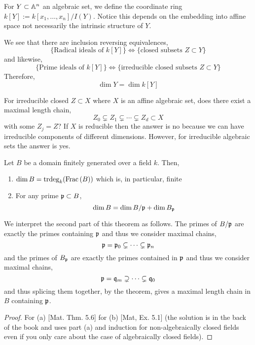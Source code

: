 \documentclass[12pt]{article}
\begin{document}
\begin{defn}
For $Y \subset \mathbb{A}^n$ an algebraic set, we define the coordinate ring $k[Y] := k[x_1, \dots, x_n]/I(Y)$. Notice this depends on the embedding into affine space not necessarily the intrinsic structure of $Y$.
\end{defn}

\begin{rmk}
We see that there are inclusion reversing equivalences,
\[ \{ \text{Radical ideals of } k[Y] \} \iff \{ \text{closed subsets } Z \subset Y \} \]
and likewise,
\[ \{ \text{Prime ideals of } k[Y] \} \iff \{ \text{irreducible closed subsets } Z \subset Y \} \]
Therefore,
\[ \dim{Y} = \dim{k[Y]} \]
\end{rmk}

\begin{rmk}
For irreducible closed $Z \subset X$ where $X$ is an affine algebraic set, does there exist a maximal length chain,
\[ Z_0 \subsetneq Z_1 \subsetneq \cdots \subsetneq Z_d \subset X \]
with some $Z_j = Z$? If $X$ is reducible then the answer is no because we can have irreducible components of different dimensions. However, for irreducible algebraic sets the answer is yes. 
\end{rmk}

\begin{thm}
Let $B$ be a domain finitely generated over a field $k$. Then,
\begin{enumerate}
\item $\dim{B} = \mathrm{trdeg}_{k}(\mathrm{Frac}\left(B\right))$ which is, in particular, finite
\item For any prime $\mathfrak{p} \subset B$,
\[ \dim{B} = \dim{B/\mathfrak{p}} + \dim{B_{\mathfrak{p}}} \]
\end{enumerate}
\end{thm}

\begin{rmk}
We interpret the second part of this theorem as follows. The primes of $B / \mathfrak{p}$ are exactly the primes containing $\mathfrak{p}$ and thus we consider maximal chains,
\[ \mathfrak{p} = \mathfrak{p}_0 \subsetneq \cdots \subsetneq \mathfrak{p}_n \]
and the primes of $B_{\mathfrak{p}}$ are exactly the primes contained in $\mathfrak{p}$ and thus we consider maximal chains,
\[ \mathfrak{p} = \mathfrak{q}_m \supsetneq \cdots \subsetneq \mathfrak{q}_0 \]
and thus splicing them together, by the theorem, gives a maximal length chain in $B$ containing $\mathfrak{p}$.
\end{rmk}

\begin{proof}
For (a) [Mat. Thm. 5.6] for (b) [Mat, Ex. 5.1] (the solution is in the back of the book and uses part (a) and induction for non-algebraically closed fields even if you only care about the case of algebraically closed fields).  
\end{proof}
\end{document}
